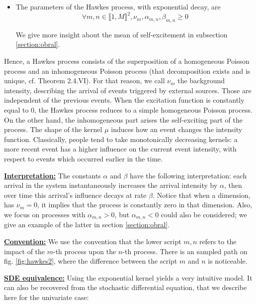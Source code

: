 \begin{definition}
\begin{itemize}
\item The parameters of the Hawkes process, with exponential decay, are $$ \forall m,n \in \llbracket 1, M \rrbracket^2, \nu_m, \alpha_{m,n}, \beta_{m,n} \geq 0$$


We give more insight about the mean of self-excitement in subsection \ref{section:obral}.
\end{itemize}
\end{definition}


Hence, a Hawkes process consists of the superposition of a homogeneous Poisson process and an inhomogeneous Poisson process (that decomposition exists and is unique, cf. \cite{daley} Theorem 2.4.VI). For that reason, we call $\nu_m$ the background intensity, describing the arrival of events triggered by external sources. Those are independent of the previous events. When the excitation function is constantly equal to $0$, the Hawkes process reduces to a simple homogeneous Poisson process. On the other hand, the inhomogeneous part arises the self-exciting part of the process. The shape of the kernel $\mu$ induces how an event changes the intensity function. Classically, people tend to take monotonically decreasing kernels: a more recent event has a higher influence on the current event intensity, with respect to events which occurred earlier in the time.

\vspace{0.5cm}

\underline{\textbf{Interpretation:}} The constants $\alpha$ and $\beta$ have the following interpretation: each arrival in the system instantaneously increases the arrival intensity by $\alpha$, then over time this arrival's influence decays at rate $\beta$.
Notice that when a dimension, has $\nu_m = 0$, it implies that the process is constantly zero in that dimension. Also, we focus on processes with $\alpha_{m,n} > 0$, but $\alpha_{m,n} < 0$ could also be considered; we give an example of the latter in section \ref{section:obral}. 

\vspace{0.5cm}

\underline{\textbf{Convention:}} We use the convention that the lower script $m,n$ refers to the impact of the $m$-th process upon the $n$-th process. There is an sampled path on fig. \ref{fig:hawkes2}, where the difference between the script $m$ and $n$ is noticeable.

\vspace{0.5cm}

\underline{\textbf{SDE equivalence:}} Using the exponential kernel yields a very intuitive model. It can also be recovered from the stochastic differential equation, that we describe here for the univariate case:

